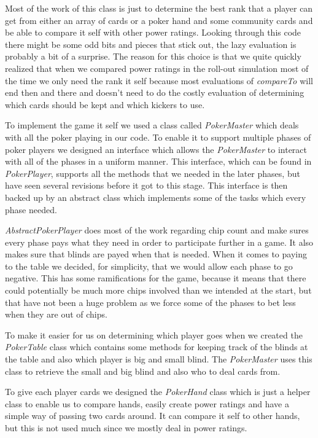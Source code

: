 \documentclass[titlepage, a4paper]{article}
\begin{document}
Most of the work of this class is
just to determine the best rank that a player can get from either an array of cards or
a poker hand and some community cards and be able to compare it self with other power ratings.
Looking through this code there might be some odd bits and pieces that stick out, the
lazy evaluation is probably a bit of a surprise. The reason for this choice is that we quite
quickly realized that when we compared power ratings in the roll-out simulation most of the
time we only need the rank it self because most evaluations of \textit{compareTo} will end then and
there and doesn't need to do the costly evaluation of determining which cards should be
kept and which kickers to use.

To implement the game it self we used a class called \textit{PokerMaster} which deals with
all the poker playing in our code. To enable it to support multiple phases of poker players
we designed an interface which allows the \textit{PokerMaster} to interact with all of the
phases in a uniform manner. This interface, which can be found in \textit{PokerPlayer},
supports all the methods that we needed in the later phases, but have seen several revisions
before it got to this stage. This interface is then backed up by an abstract class which
implements some of the tasks which every phase needed.

\textit{AbstractPokerPlayer} does
most of the work regarding chip count and make sures every phase pays what they need in
order to participate further in a game. It also makes sure that blinds are payed when
that is needed. When it comes to paying to the table we decided, for simplicity, that we
would allow each phase to go negative. This has some ramifications for the game, because
it means that there could potentially be much more chips involved than we intended at the
start, but that have not been a huge problem as we force some of the phases to bet less
when they are out of chips.

To make it easier for us on determining which player goes when we created the
\textit{PokerTable} class which contains some methods for keeping track of the
blinds at the table and also which player is big and small blind. The \textit{PokerMaster}
uses this class to retrieve the small and big blind and also who to deal cards from.

To give each player cards we designed the \textit{PokerHand} class which is just a helper
class to enable us to compare hands, easily create power ratings and have a simple way
of passing two cards around. It can compare it self to other hands, but this is not
used much since we mostly deal in power ratings.
\end{document}
